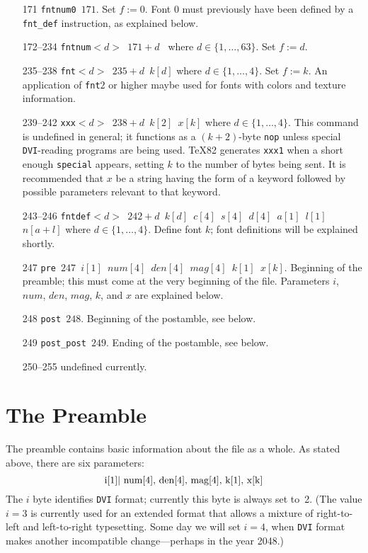 \documentclass[10pt, a4paper]{article}
\begin{document}
\begin{itemize}
\item[171] \texttt{fntnum0 $171$}. 
Set $f:=0$. Font 0 must previously have been
defined by a \texttt{fnt\_def} instruction, as explained below.

\item[172--234] \texttt{fntnum$<d>$ $171+d$ } where $d\in\{1,\dots,63\}$. 
Set $f:=d$. 


\item[235--238] \texttt{fnt$<d>$ $235+d$ $k[d]$} where $d\in\{1,\dots,4\}$. 
Set $f:=k$. 
An application of \texttt{fnt$2$} or higher 
maybe used for fonts with colors and texture information. 

\item[239--242] \texttt{xxx$<d>$ $238+d$ $k[2]$ $x[k]$} 
where $d\in\{1,\dots,4\}$. 
This command is undefined in general; 
it functions as a $(k+2)$-byte \texttt{nop} 
unless special \texttt{DVI}-reading programs are being used. 
\TeX82 generates \texttt{xxx1} when a short enough \texttt{special} appears, 
setting $k$ to the number of bytes being sent. 
It is recommended that $x$ be a string having the form of a keyword 
followed by possible parameters relevant to that keyword.

\item[243--246] \texttt{fntdef$<d>$ $242+d$ 
$k[d]$ $c[4]$ $s[4]$ $d[4]$ $a[1]$ $l[1]$ $n[a+l]$} 
where $d\in\{1,\dots,4\}$. 
Define font $k$; font definitions will be explained shortly.

\item[247] \texttt{pre $247$ $i[1]$ $num[4]$ $den[4]$ $mag[4]$ $k[1]$ $x[k]$}.
Beginning of the preamble; 
this must come at the very beginning of the file. 
Parameters $i$, $num$, $den$, $mag$, $k$, and $x$ are explained below.

\item[248] \texttt{post $248$}. 
Beginning of the postamble, see below. 

\item[249] \texttt{post\_post $249$}. 
Ending of the postamble, see below. 

\item[250--255] undefined currently. 
\end{itemize}

\section{The Preamble}\label{sec:preamble}

The preamble contains basic information about the file as a whole. 
As stated above, there are six parameters:
%
\[
\hbox{i[1]| num[4], den[4], mag[4], k[1], x[k]}
\]
%
The $i$ byte identifies \texttt{DVI} format; 
currently this byte is always set to~2. 
(The value $i=3$ is currently used for an extended format that
allows a mixture of right-to-left and left-to-right typesetting.
Some day we will set $i=4$, when \texttt{DVI} format makes another
incompatible change---perhaps in the year 2048.)
\end{document}

